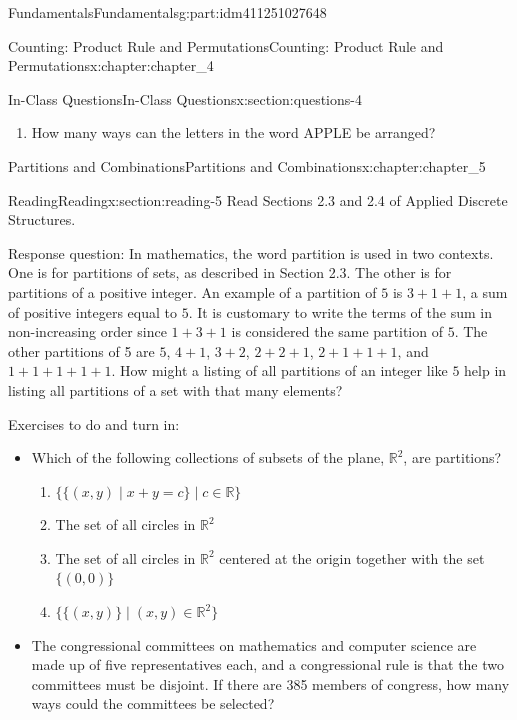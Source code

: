 \documentclass[oneside,10pt,]{book}
\numberwithin{equation}{section}
\begin{document}
\begin{partptx}{Fundamentals}{}{Fundamentals}{}{}{g:part:idm411251027648}
\begin{chapterptx}{Counting: Product Rule and Permutations}{}{Counting: Product Rule and Permutations}{}{}{x:chapter:chapter_4}
\begin{sectionptx}{In-Class Questions}{}{In-Class Questions}{}{}{x:section:questions-4}
\begin{enumerate}[label=\arabic*.]
\begin{enumerate}[label=(\alph*)]
\end{enumerate}
%
\item{}How many ways can the letters in the word APPLE be arranged?%
\end{enumerate}
%
\end{sectionptx}
\end{chapterptx}
%
\typeout{************************************************}
\typeout{************************************************}
%
\begin{chapterptx}{Partitions and Combinations}{}{Partitions and Combinations}{}{}{x:chapter:chapter_5}
%
%
%
\typeout{************************************************}
\typeout{************************************************}
%
\begin{sectionptx}{Reading}{}{Reading}{}{}{x:section:reading-5}
Read Sections 2.3 and 2.4 of Applied Discrete Structures.%
\par
Response question: In mathematics, the word partition is used in two contexts. One is for partitions of sets, as described in Section 2.3. The other is for partitions of a positive integer.  An example of a partition of \(5\) is \(3+1+1\), a sum of positive integers equal to \(5\). It is customary to write the terms of the sum in non-increasing order since \(1+3+1\) is considered the same partition of \(5\). The other partitions of 5 are \(5\), \(4+1\), \(3+2\), \(2+2+1\), \(2+1+1+1\), and \(1+1+1+1+1\). How might a listing of all partitions of an integer like \(5\) help in listing all partitions of a set with that many elements?%
\par
Exercises to do and turn in:%
\begin{itemize}[label=\textbullet]
\item{}Which of the following collections of subsets of the plane, \(\mathbb{R}^2\), are partitions?%
\begin{enumerate}[label=(\alph*)]
\item{}\(\{ \{(x, y) \mid x + y = c \} \mid c \in \mathbb{R} \}\)%
\item{}The set of all circles in \(\mathbb{R}^2 \)%
\item{}The set of all circles in \(\mathbb{R}^2\) centered at the origin together with the set \(\{(0,0)\}\)%
\item{}\(\{\{(x, y)\} \mid (x, y) \in \mathbb{R}^2  \} \)%
\end{enumerate}
%
\item{}The congressional committees on mathematics and computer science are made up of five representatives each, and a congressional rule is that the two committees must be disjoint. If there are 385 members of congress, how many ways could the committees be selected?%

\end{itemize}
\end{sectionptx}
\end{chapterptx}
\end{partptx}
\end{document}
